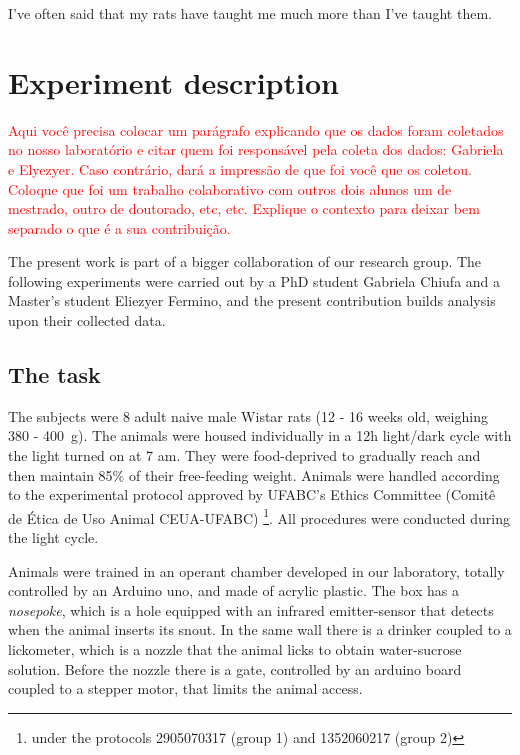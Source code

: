 \begin{savequote}[75mm]
I've often said that my rats have taught me much more than I've taught them.
\end{savequote}

\chapter{Experiment description}
\label{chap:experiment}


\textcolor{red}{Aqui você precisa colocar um parágrafo explicando que os dados foram coletados no nosso laboratório e citar quem foi responsável pela coleta dos dados: Gabriela e Elyezyer. Caso contrário, dará a impressão de que foi você que os coletou. Coloque que foi um trabalho colaborativo com outros dois alunos um de mestrado, outro de doutorado, etc, etc. Explique o contexto para deixar bem separado o que é a sua contribuição.}

The present work is part of a bigger collaboration of our research group. The following experiments were carried out by a PhD student Gabriela Chiufa and a Master's student Eliezyer Fermino, and the present contribution builds analysis upon their collected data.

\section{The task}
    The subjects were 8 adult naive male Wistar rats (12 - 16 weeks old, weighing 380 - 400~g). The animals were housed individually in a 12h light/dark cycle with the light turned on at 7 am. They were food-deprived to gradually reach and then maintain 85\% of their free-feeding weight. Animals were handled according to the experimental protocol approved by UFABC's Ethics Committee (Comitê de Ética de Uso Animal CEUA-UFABC) \footnote{under the protocols 2905070317 (group 1) and 1352060217 (group 2)}. All procedures were conducted during the light cycle.
    
    Animals were trained in an operant chamber developed in our laboratory, totally controlled by an Arduino uno, and made of acrylic plastic. The box has a \textit{nosepoke}, which is a hole equipped with an infrared emitter-sensor that detects when the animal inserts its snout. In the same wall there is a drinker coupled to a lickometer, which is a nozzle that the animal licks to obtain water-sucrose solution. Before the nozzle there is a gate, controlled by an arduino board coupled to a stepper motor, that limits the animal access. 
    
